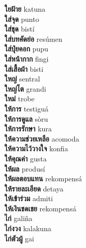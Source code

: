 \textbf{ ใยฝ้าย  } katuna \\
\textbf{ ใส่จุด  } punto \\
\textbf{ ใส่ชุด  } bistí \\
\textbf{ ใส่บทคัดย่อ  } resúmen \\
\textbf{ ใส่ปุ๋ยคอก  } pupu \\
\textbf{ ใส่หน้ากาก  } fingi \\
\textbf{ ใส่เสื้อผ้า  } bisti \\
\textbf{ ใหญ่  } sentral \\
\textbf{ ใหญ่โต  } grandi \\
\textbf{ ใหม่  } trobe \\
\textbf{ ให้การ  } testiguá \\
\textbf{ ให้การดูแล  } sòru \\
\textbf{ ให้การรักษา  } kura \\
\textbf{ ให้ความช่วยเหลือ  } acomoda \\
\textbf{ ให้ความไว้วางใจ  } konfia \\
\textbf{ ให้คุณค่า  } gusta \\
\textbf{ ให้ผล  } produsí \\
\textbf{ ให้ผลตอบแทน  } rekompensá \\
\textbf{ ให้รายละเอียด  } detaya \\
\textbf{ ให้เข้าร่วม  } admiti \\
\textbf{ ให้เงินชดเชย  } rekompensá \\
\textbf{ ไก่  } galiña \\
\textbf{ ไก่งวง  } kalakuna \\
\textbf{ ไก่ตัวผู้  } gai \\

